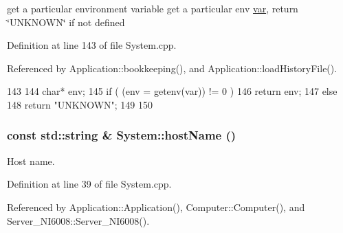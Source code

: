 get a particular environment variable get a particular env \hyperlink{classvar}{var}, return \char`\"{}UNKNOWN\char`\"{} if not defined 

Definition at line 143 of file System.cpp.

Referenced by Application::bookkeeping(), and Application::loadHistoryFile().


\begin{DoxyCode}
143                                               {
144   char* env;
145   if  ( (env = getenv(var)) != 0 ) {
146     return env;
147   } else {
148     return "UNKNOWN";
149   }
150 }
\end{DoxyCode}
\hypertarget{namespaceSystem_a89320a729880098922e8b505db1137ec}{
\subsubsection[{hostName}]{\setlength{\rightskip}{0pt plus 5cm}const std::string \& System::hostName ()}}
\label{namespaceSystem_a89320a729880098922e8b505db1137ec}


Host name. 

Definition at line 39 of file System.cpp.

Referenced by Application::Application(), Computer::Computer(), and Server\_\-NI6008::Server\_\-NI6008().


